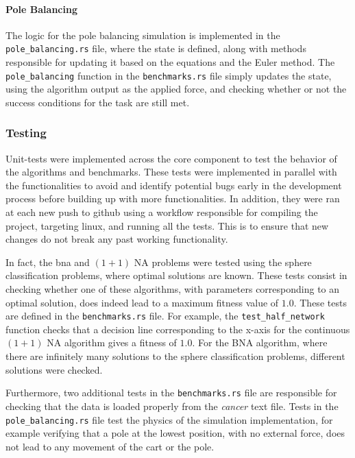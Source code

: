 \paragraph{Pole Balancing} The logic for the pole balancing simulation is implemented in the  \\ \texttt{pole\_balancing.rs} file, where the state is defined, along with methods
responsible for updating it based on the equations and the Euler method. The \texttt{pole\_balancing} function in the \texttt{benchmarks.rs} file simply
updates the state, using the algorithm output as the applied force, and checking whether or not the success conditions for the task are still met.

\subsubsection{Testing}

Unit-tests were implemented across the core component to test the behavior of the algorithms and benchmarks.
These tests were implemented in parallel with the functionalities to avoid and identify potential bugs early in the development process before
building up with more functionalities. In addition, they were ran at each new push to github using a workflow responsible for compiling the project,
targeting linux, and running all the tests. This is to ensure that new changes do not break any past working functionality.

In fact, the bna and $(1 + 1)$ NA problems were tested using the sphere classification problems, where optimal solutions are known. These tests
consist in checking whether one of these algorithms, with parameters corresponding to an optimal solution, does indeed lead to a maximum fitness value
of $1.0$. These tests are defined in the \texttt{benchmarks.rs} file. For example, the \texttt{test\_half\_network} function checks that a decision line
corresponding to the x-axis for the continuous $(1 + 1)$ NA algorithm gives a fitness of $1.0$. For the BNA algorithm, where there are infinitely many
solutions to the sphere classification problems, different solutions were checked.

Furthermore, two additional tests in the \texttt{benchmarks.rs} file are responsible for checking that the data is loaded properly from the \textit{cancer}
text file. Tests in the \texttt{pole\_balancing.rs} file test the physics of the simulation implementation, for example verifying that a pole at the lowest
position, with no external force, does not lead to any movement of the cart or the pole.

